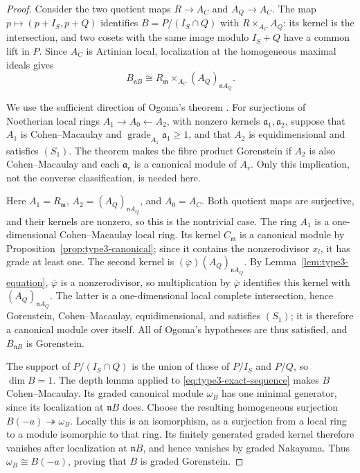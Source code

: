 \documentclass[10pt]{amsart}
\theoremstyle{plain}
\begin{document}
\begin{proof}
Consider the two quotient maps \(R\to A_C\) and \(A_Q\to A_C\).
The map \(p\mapsto(p+I_S,p+Q)\) identifies
\(B=P/(I_S\cap Q)\) with \(R\times_{A_C}A_Q\): its kernel is the
intersection, and two cosets with the same image modulo \(I_S+Q\)
have a common lift in \(P\).  Since \(A_C\) is Artinian local,
localization at the homogeneous maximal ideals gives
\[
B_{\mathfrak nB}
\cong R_{\mathfrak m}\times_{A_C}(A_Q)_{\mathfrak nA_Q}.
\]

We use the sufficient direction of Ogoma's theorem
\cite[Theorem~4]{Ogoma87}.  For surjections of Noetherian local rings
\(A_1\to A_0\leftarrow A_2\), with nonzero kernels
\(\mathfrak a_1,\mathfrak a_2\), suppose that \(A_1\) is
Cohen--Macaulay and \(\operatorname{grade}_{A_1}\mathfrak a_1\ge1\),
and that \(A_2\) is equidimensional and satisfies \((S_1)\).
The theorem makes the fibre product Gorenstein if \(A_2\) is also
Cohen--Macaulay and each \(\mathfrak a_r\) is a canonical module of
\(A_r\).  Only this implication, not the converse classification, is
needed here.

Here \(A_1=R_{\mathfrak m}\),
\(A_2=(A_Q)_{\mathfrak nA_Q}\), and \(A_0=A_C\).  Both quotient maps
are surjective, and their kernels are nonzero, so this is the
nontrivial case.  The ring \(A_1\) is a one-dimensional
Cohen--Macaulay local ring.  Its kernel \(C_{\mathfrak m}\) is a
canonical module by Proposition~\ref{prop:type3-canonical}; since it
contains the nonzerodivisor \(x_l\), it has grade at least one.  The
second kernel is
\((\bar\varphi)(A_Q)_{\mathfrak nA_Q}\).  By
Lemma~\ref{lem:type3-equation}, \(\bar\varphi\) is a nonzerodivisor,
so multiplication by \(\bar\varphi\) identifies this kernel with
\((A_Q)_{\mathfrak nA_Q}\).  The latter is a one-dimensional local
complete intersection, hence Gorenstein, Cohen--Macaulay,
equidimensional, and satisfies \((S_1)\); it is therefore a canonical
module over itself.  All of Ogoma's hypotheses are thus satisfied, and
\(B_{\mathfrak nB}\) is Gorenstein.

The support of \(P/(I_S\cap Q)\) is the union of those of \(P/I_S\)
and \(P/Q\), so \(\dim B=1\).  The depth lemma applied to
\eqref{eq:type3-exact-sequence} makes \(B\) Cohen--Macaulay.
Its graded canonical module \(\omega_B\) has one minimal generator,
since its localization at \(\mathfrak nB\) does.  Choose the resulting
homogeneous surjection \(B(-a)\twoheadrightarrow\omega_B\).
Locally this is an isomorphism, as a surjection from a local ring to a
module isomorphic to that ring.  Its finitely generated graded kernel
therefore vanishes after localization at \(\mathfrak nB\), and hence
vanishes by graded Nakayama.  Thus \(\omega_B\cong B(-a)\), proving
that \(B\) is graded Gorenstein.
\end{proof}
\end{document}
